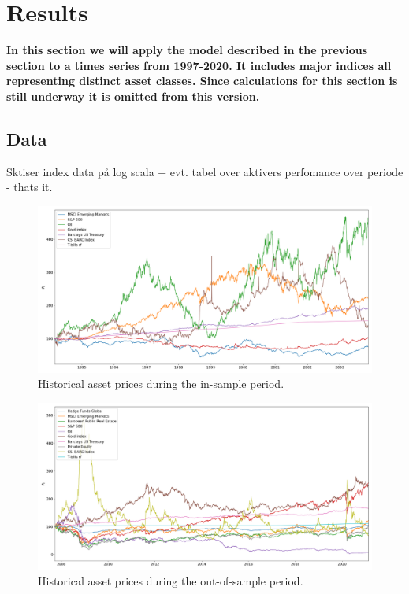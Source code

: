 \section{Results}

\textbf{In this section we will apply the model described in the previous section to a times series from 1997-2020. It includes major indices all representing distinct asset classes. Since calculations for this section is still underway it is omitted from this version.}


\subsection{Data}

Sktiser index data på log scala + evt. tabel over aktivers perfomance over periode - thats it.

\begin{figure}[H]
    \centering
    \includegraphics[width=1\textwidth]{analysis/portfolio_exercise/images/asset_vals_insample.png}
    \caption[Historical asset prices during the in-sample period]{Historical asset prices during the in-sample period.}
    \label{fig:MPC_data}
\end{figure}


\begin{figure}[H]
    \centering
    \includegraphics[width=1\textwidth]{analysis/portfolio_exercise/images/asset_vals_oos.png}
    \caption[Historical asset prices during the out-of-sample period]{Historical asset prices during the out-of-sample period.}
    \label{fig:MPC_data}
\end{figure}

